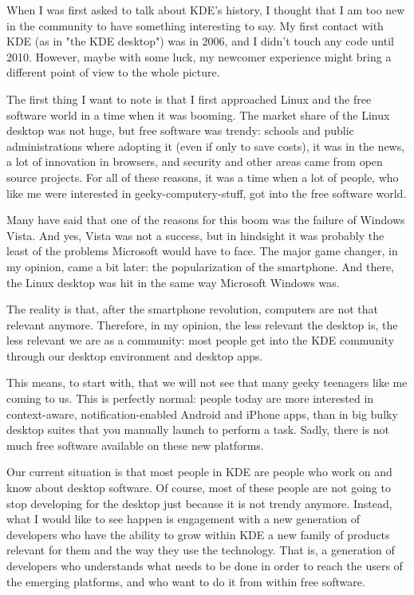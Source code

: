 

\noindent{}When I was first asked to talk about KDE's history, I thought that I am too new in the community to have something interesting to say. My first contact with KDE (as in "the KDE desktop") was in 2006, and I didn't touch any code until 2010. However, maybe with some luck, my newcomer experience might bring a different point of view to the whole picture.

The first thing I want to note is that I first approached Linux and the free software world in a time when it was booming. The market share of the Linux desktop was not huge, but free software was trendy: schools and public administrations where adopting it (even if only to save costs), it was in the news, a lot of innovation in browsers, and security and other areas came from open source projects. For all of these reasons, it was a time when a lot of people, who like me were interested in geeky-computery-stuff, got into the free software world.

Many have said that one of the reasons for this boom was the failure of Windows Vista. And yes, Vista was not a success, but in hindsight it was probably the least of the problems Microsoft would have to face. The major game changer, in my opinion, came a bit later: the popularization of the smartphone. And there, the Linux desktop was hit in the same way Microsoft Windows was.

The reality is that, after the smartphone revolution, computers are not that relevant anymore. Therefore, in my opinion, the less relevant the desktop is, the less relevant we are as a community: most people get into the KDE community through our desktop environment and desktop apps. 

This means, to start with, that we will not see that many geeky teenagers like me coming to us. This is perfectly normal: people today are more interested in context-aware, notification-enabled Android and iPhone apps, than in big bulky desktop suites that you manually launch to perform a task. Sadly, there is not much free software available on these new platforms.

Our current situation is that most people in KDE are people who work on and know about desktop software. Of course, most of these people are not going to stop developing for the desktop just because it is not trendy anymore. Instead, what I would like to see happen is engagement with a new generation of developers who have the ability to grow within KDE a new family of products relevant for them and the way they use the technology. That is, a generation of developers who understands what needs to be done in order to reach the users of the emerging platforms, and who want to do it from within free software.

